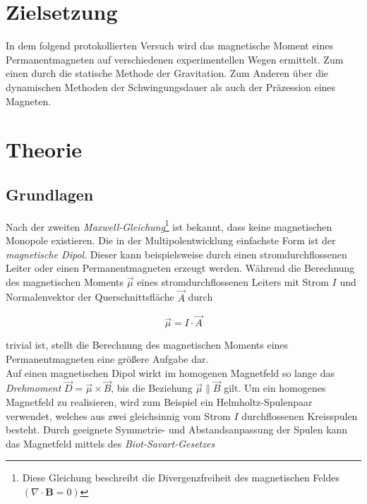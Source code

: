 



\section{Zielsetzung}
\label{sec:Zielsetzung}

In dem folgend protokollierten Versuch wird das magnetische Moment eines Permanentmagneten auf verschiedenen 
experimentellen Wegen ermittelt. Zum einen durch die statische Methode der Gravitation. Zum Anderen über die 
dynamischen Methoden der Schwingungsdauer als auch der Präzession eines Magneten.

\section{Theorie}
\label{sec:Theorie}

\subsection{Grundlagen}
Nach der zweiten \emph{Maxwell-Gleichung}\footnote{Diese Gleichung beschreibt die Divergenzfreiheit des magnetischen Feldes
$\left(\nabla \cdot \symbf{B} = 0\right)$} ist bekannt, dass keine magnetischen Monopole existieren. Die in der 
Multipolentwicklung einfachste Form ist der \emph{magnetische Dipol}. Dieser kann beispielsweise durch einen stromdurchflossenen 
Leiter oder einen Permanentmagneten erzeugt werden. Während die Berechnung des magnetischen Moments $\vec{\mu}$ eines 
stromdurchflossenen Leiters mit Strom $I$ und Normalenvektor der Querschnittsfläche $\vec{A}$ durch 

\begin{equation*}
    \vec{\mu} = I \cdot \vec{A}
\end{equation*}

\noindent trivial ist, stellt die Berechnung des magnetischen Moments eines Permanentmagneten eine größere Aufgabe dar.\\
\noindent Auf einen magnetischen Dipol wirkt im homogenen Magnetfeld so lange das \emph{Drehmoment} $\vec{D} = \vec{\mu} \times \vec{B}\label{eqn:D_B}$,
bis die Beziehung $\vec{\mu} \parallel \vec{B}$ gilt. Um ein homogenes Magnetfeld zu realisieren, wird zum Beispiel ein 
Helmholtz-Spulenpaar verwendet, welches aus zwei gleichsinnig vom Strom $I$ durchflossenen Kreisspulen besteht. Durch geeignete 
Symmetrie- und Abstandsanpassung der Spulen kann das Magnetfeld mittels des \emph{Biot-Savart-Gesetzes}

